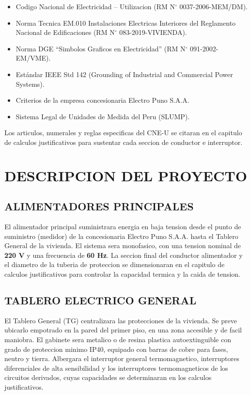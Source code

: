 \begin{itemize}
  \item Codigo Nacional de Electricidad -- Utilizacion (RM N\(^\circ\) 0037-2006-MEM/DM).
  \item Norma Tecnica EM.010 Instalaciones Electricas Interiores del Reglamento Nacional de Edificaciones (RM N\(^\circ\) 083-2019-VIVIENDA).
  \item Norma DGE ``Simbolos Graficos en Electricidad'' (RM N\(^\circ\) 091-2002-EM/VME).
  \item Estándar IEEE Std 142 (Grounding of Industrial and Commercial Power Systems).
  \item Criterios de la empresa concesionaria Electro Puno S.A.A.
  \item Sistema Legal de Unidades de Medida del Peru (SLUMP).
\end{itemize}

Los articulos, numerales y reglas especificas del CNE-U se citaran en el capitulo de calculos justificativos para sustentar cada seccion de conductor e interruptor.

\section{DESCRIPCION DEL PROYECTO}

\subsection{ALIMENTADORES PRINCIPALES}

El alimentador principal suministrara energia en baja tension desde el punto de suministro (medidor) de la concesionaria Electro Puno S.A.A. hasta el Tablero General de la vivienda. El sistema sera monofasico, con una tension nominal de \textbf{220 V} y una frecuencia de \textbf{60 Hz}.
La seccion final del conductor alimentador y el diametro de la tuberia de proteccion se dimensionaran en el capitulo de calculos justificativos para controlar la capacidad termica y la caida de tension.

\subsection{TABLERO ELECTRICO GENERAL}

El Tablero General (TG) centralizara las protecciones de la vivienda. Se preve ubicarlo empotrado en la pared del primer piso, en una zona accesible y de facil maniobra. El gabinete sera metalico o de resina plastica autoextinguible con grado de proteccion minimo IP40, equipado con barras de cobre para fases, neutro y tierra. Albergara el interruptor general termomagnetico, interruptores diferenciales de alta sensibilidad y los interruptores termomagneticos de los circuitos derivados, cuyas capacidades se determinaran en los calculos justificativos.

